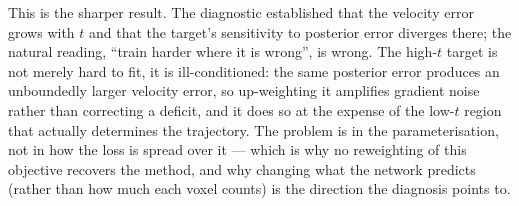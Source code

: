 {This is the sharper result. The diagnostic established that the velocity error
grows with $t$ and that the target's sensitivity to posterior error diverges
there; the natural reading, ``train harder where it is wrong'', is wrong. The
high-$t$ target is not merely hard to fit, it is ill-conditioned: the same
posterior error produces an unboundedly larger velocity error, so up-weighting
it amplifies gradient noise rather than correcting a deficit, and it does so at
the expense of the low-$t$ region that actually determines the trajectory. The
problem is in the parameterisation, not in how the loss is spread over it ---
which is why no reweighting of this objective recovers the method, and why
changing what the network predicts (rather than how much each voxel counts) is
the direction the diagnosis points to.%
}

\newcommand{\REMEDYCONCLUSION}{%
Neither reweighting of the flow-matching objective recovers the method: the
decision-region reweighting is locally effective on the smallest class but costs
the primary metric, and the late-time reweighting degrades every region.%
}
